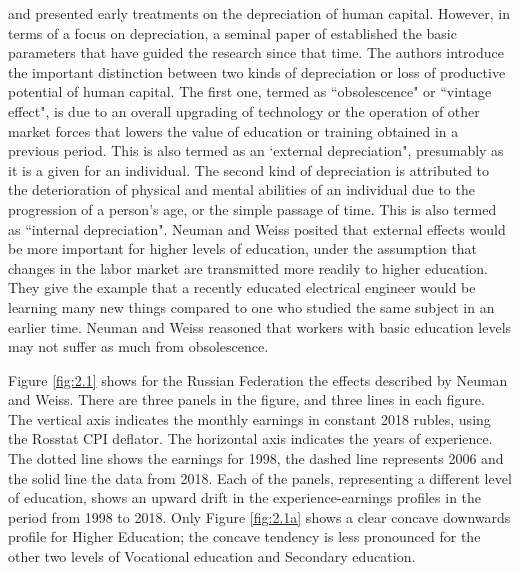 \documentclass[alpha-refs]{wiley-article-02b}
\begin{document}
\citet{rosen_176._1976}  and \citet{mincer_175._1982} presented early treatments on the depreciation of human capital. However, in terms of a focus on depreciation, a seminal paper of \citet{neuman_091._1995} established the basic parameters that have guided the research since that time. The authors introduce the important distinction between two kinds of depreciation or loss of productive potential of human capital. The first one, termed as ``obsolescence" or ``vintage effect", is due to an overall upgrading of technology or the operation of other market forces that lowers the value of education or training obtained in a previous period. This is also termed as an `external depreciation", presumably as it is a given for an individual. The second kind of depreciation is attributed to the deterioration of physical and mental abilities of an individual due to the progression of a person's age, or the simple passage of time. This is also termed as ``internal depreciation". Neuman and Weiss posited that external effects would be more important for higher levels of education, under the assumption that changes in the labor market are transmitted more readily to higher education. They give the example that a recently educated electrical engineer would be learning many new things compared to one who studied the same subject in an earlier time. Neuman and Weiss reasoned that workers with basic education levels may not suffer as much from obsolescence. 

Figure \ref{fig:2.1} shows for the Russian Federation the effects described by Neuman and Weiss. There are three panels in the figure, and three lines in each figure. The vertical axis indicates the monthly earnings in constant 2018 rubles, using the Rosstat CPI deflator. The horizontal axis indicates the years of experience. The dotted line shows the earnings for 1998, the dashed line represents 2006 and the solid line the data from 2018. Each of the panels, representing a different level of education, shows an upward drift in the experience-earnings profiles in the period from 1998 to 2018. Only Figure \ref{fig:2.1a} shows a clear concave downwards profile for Higher Education; the concave tendency is less pronounced for the other two levels of Vocational education and Secondary education.
	
\end{document}
